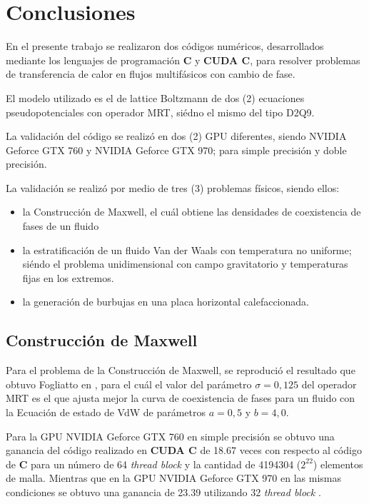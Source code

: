 \chapter{Conclusiones}
\graphicspath{{figs/cap4/}}
\label{cap5}

En el presente trabajo se realizaron dos códigos numéricos, desarrollados mediante los lenguajes de programación \textbf{C} y \textbf{CUDA C}, para resolver problemas de transferencia de calor en flujos multifásicos con cambio de fase.

El modelo utilizado es el de lattice Boltzmann de dos (2) ecuaciones pseudopotenciales con operador MRT, siédno el mismo del tipo D2Q9.

La validación del código se realizó en dos (2) GPU diferentes, siendo NVIDIA Geforce GTX 760 y  NVIDIA Geforce GTX 970; para simple precisión y doble precisión.

La validación se realizó por medio de tres (3) problemas físicos, siendo ellos:

\begin{itemize}
    
    \item la Construcción de Maxwell, el cuál obtiene las densidades de coexistencia de fases de un fluido 

    \item la estratificación de un fluido Van der Waals con temperatura no uniforme; siéndo el problema unidimensional con campo gravitatorio y temperaturas fijas en los extremos.

    \item la generación de burbujas en una placa horizontal calefaccionada.

\end{itemize}

\section{Construcción de Maxwell}

Para el problema de la Construcción de Maxwell, se reprodució el resultado que obtuvo Fogliatto en \cite{fogliatto2019simulation}, para el cuál el valor del parámetro $\sigma = 0,125$ del operador MRT es el que ajusta mejor la curva de coexistencia de fases para un fluido con la Ecuación de estado de VdW de parámetros $ a = 0,5 $ y $ b = 4,0 $. 

Para la GPU NVIDIA Geforce GTX 760 en simple precisión se obtuvo una ganancia del código realizado en \textbf{CUDA C} de 18.67 veces con respecto al código de \textbf{C} para un número de 64 \textit{thread block} y la cantidad de 4194304 ($2^{22}$) elementos de malla. Mientras que en la  GPU NVIDIA Geforce GTX 970 en las mismas condiciones se obtuvo una ganancia de 23.39 utilizando 32 \textit{thread block} .

